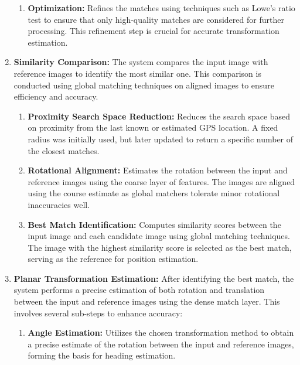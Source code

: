 \begin{enumerate}
\begin{enumerate}
        \item \textbf{Optimization:}  
        Refines the matches using techniques such as Lowe's ratio test to ensure that only high-quality matches are considered for further processing. This refinement step is crucial for accurate transformation estimation. 
    \end{enumerate}
    \item \textbf{Similarity Comparison:}  
    The system compares the input image with reference images to identify the most similar one. This comparison is conducted using global matching techniques on aligned images to ensure efficiency and accuracy.
    \begin{enumerate}
        \item \textbf{Proximity Search Space Reduction:}  
        Reduces the search space based on proximity from the last known or estimated GPS location. A fixed radius was initially used, but later updated to return a specific number of the closest matches. 
        
        \item \textbf{Rotational Alignment:}  
        Estimates the rotation between the input and reference images using the coarse layer of features. The images are aligned using the course estimate as global matchers tolerate minor rotational inaccuracies well.
        
        \item \textbf{Best Match Identification:}  
        Computes similarity scores between the input image and each candidate image using global matching techniques. The image with the highest similarity score is selected as the best match, serving as the reference for position estimation.
    \end{enumerate}



    \item \textbf{Planar Transformation Estimation:}  
    After identifying the best match, the system performs a precise estimation of both rotation and translation between the input and reference images using the dense match layer. This involves several sub-steps to enhance accuracy:
    \begin{enumerate}
        \item \textbf{Angle Estimation:}  
        Utilizes the chosen transformation method to obtain a precise estimate of the rotation between the input and reference images, forming the basis for heading estimation.
        

\end{enumerate}
\end{enumerate}
